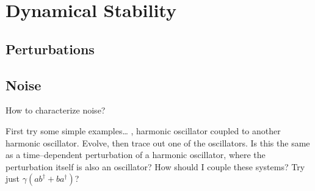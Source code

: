 
\chapter{Dynamical Stability}
\label{chap:dynamicalStability}
%

\section{Perturbations}

\section{Noise}

How to characterize noise?

First try some simple examples\dots
\ie, harmonic oscillator coupled to another harmonic oscillator.
Evolve, then trace out one of the oscillators.  Is this the same as
a time--dependent perturbation of a harmonic oscillator, where the
perturbation itself is also an oscillator?  How should I couple these
systems?  Try just $\gamma\left( a b^\dagger + b a^\dagger\right)$?

